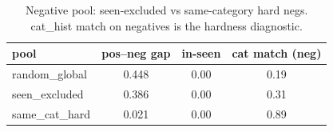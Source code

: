 \begin{table}[t]\centering
\caption{Negative pool: seen-excluded vs same-category hard negs. cat\_hist match on negatives is the hardness diagnostic.}
\label{tab:agod-three-tower-neg}
\begin{tabular}{lccc}\toprule
pool & pos--neg gap & in-seen & cat match (neg) \\
\midrule
random\_global & 0.448 & 0.00 & 0.19 \\
seen\_excluded & 0.386 & 0.00 & 0.31 \\
same\_cat\_hard & 0.021 & 0.00 & 0.89 \\
\bottomrule
\end{tabular}
\end{table}
